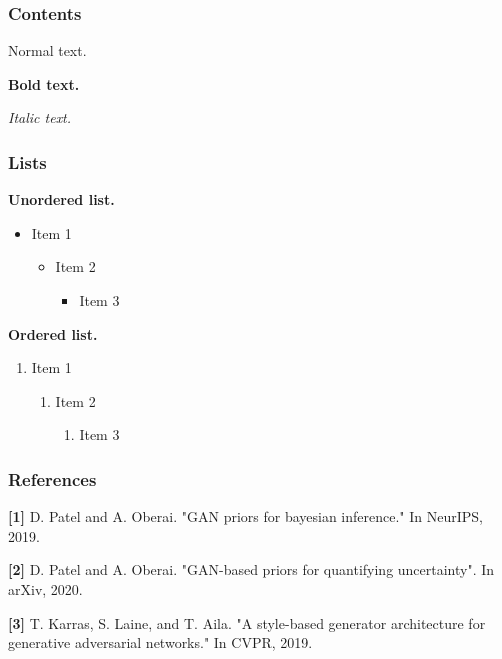 \documentclass[10pt,aspectratio=169]{beamer}
\begin{document}
\setlength{\abovedisplayskip}{1pt}
\setlength{\belowdisplayskip}{1pt}
\setlength{\abovedisplayshortskip}{1pt}
\setlength{\belowdisplayshortskip}{1pt}

{
\begin{frame}[plain,t]
\titlepage
\end{frame}
}

\begin{frame}[t]
\frametitle{Contents}
Normal text.

\textbf{Bold text.} 

\textit{Italic text.} 
\end{frame}

\begin{frame}[t]
\frametitle{Lists}
\textbf{Unordered list.}
\begin{itemize}
    \item Item 1
        \begin{itemize}
            \item Item 2
                \begin{itemize}
                    \item Item 3
                \end{itemize}
        \end{itemize}
\end{itemize}
\textbf{Ordered list.}
\begin{enumerate}
    \item Item 1
        \begin{enumerate}
            \item Item 2
                \begin{enumerate}
                    \item Item 3
                \end{enumerate}
        \end{enumerate}
\end{enumerate}
\end{frame}

\begin{frame}[t]
\frametitle{References}
\textbf{[1]} D. Patel and A. Oberai. "GAN priors for bayesian inference." In NeurIPS, 2019.

\textbf{[2]} D. Patel and A. Oberai. "GAN-based priors for quantifying uncertainty". In arXiv, 2020.

\textbf{[3]} T. Karras, S. Laine, and T. Aila. "A style-based generator architecture for generative adversarial networks." In CVPR, 2019.
\end{frame}

{
\begin{frame}[plain,t]
\end{frame}
}
\end{document}
